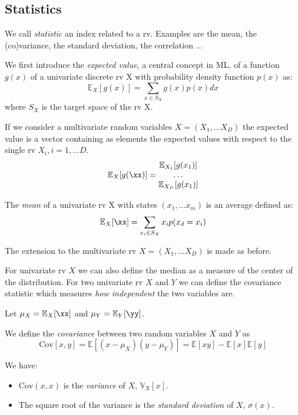 \subsection{Statistics}

 We call \textit{statistic} an   index related to a rv. Examples are the mean, the (co)variance, the standard deviation, the correlation ...

 We first introduce the \textit{expected value}, a central concept in ML, of a function $g(x)$ of a univariate discrete rv X with probability density function $p(x)$ as:
   $$\mathbb{E}_X[g(x)]=\sum_{x \in S_X} g(x)p(x)dx$$
   where $S_X$ is the target space of the rv X.
  
   If we consider a multivariate random variables $X=(X_1, \ldots X_D)$ the expected value is a vector containing as elements the expected values with respect to the single rv $X_i, i=1, \ldots D$.
   $$ \mathbb{E}_X[g(\xx)]=\begin{matrix} 
   \mathbb{E}_{X_1}[g(x_1)] \\
   \ldots \\
   \mathbb{E}_{X_D}[g(x_1)] 
   \end{matrix}
   $$
  

   \begin{definition} 
   The \textit{mean} of a univariate rv X with states $(x_1, \ldots x_m)$ is an average defined as:   $$\mathbb{E}_X[\xx]=\sum_{x_i \in S_X}x_i p(x_d=x_i)$$
   \end{definition}
   
The extension to the multivariate rv $X=(X_1, \ldots X_D)$ is made as before.
   
For univariate rv $X$ we can also define the median as a measure of the center of the distribution.
 For two univariate rv $X$ and $Y$ we can define the covariance statistic which measures \textit{how independent} the two variables are. 
  
  
   Let $\mu_X=\mathbb{E}_X[\xx]$ and $\mu_Y=\mathbb{E}_Y[\yy]$.
 \begin{definition}
     We define the \textit{covariance} between two random variables $X$ and $Y$ as
     $$ \text{Cov}[x, y] = \mathbb{E}[(x - \mu_X)(y - \mu_Y)] = \mathbb{E}[xy] - \mathbb{E}[x]\mathbb{E}[y] $$
 \end{definition}

 We have:
 \begin{itemize}
\item $\text{Cov}(x, x)$ is the \textit{variance} of $X$, $\mathbb{V}_X[x]$.
\item The square root of the variance is the \textit{standard deviation} of $X$, $\sigma(x)$.
 \end{itemize}
 
